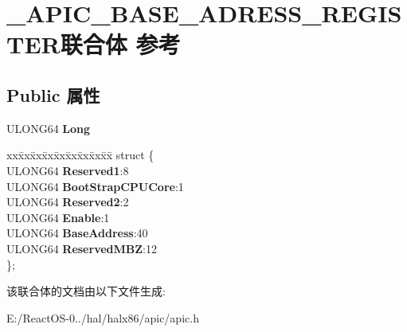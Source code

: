 \hypertarget{union___a_p_i_c___b_a_s_e___a_d_r_e_s_s___r_e_g_i_s_t_e_r}{}\section{\+\_\+\+A\+P\+I\+C\+\_\+\+B\+A\+S\+E\+\_\+\+A\+D\+R\+E\+S\+S\+\_\+\+R\+E\+G\+I\+S\+T\+E\+R联合体 参考}
\label{union___a_p_i_c___b_a_s_e___a_d_r_e_s_s___r_e_g_i_s_t_e_r}
\subsection*{Public 属性}
\begin{DoxyCompactItemize}
\item 
\mbox{\label{union___a_p_i_c___b_a_s_e___a_d_r_e_s_s___r_e_g_i_s_t_e_r_ae8ef491fd01fe4657ab5649e8cb46352}} 
U\+L\+O\+N\+G64 {\bfseries Long}
\item 
\mbox{\label{union___a_p_i_c___b_a_s_e___a_d_r_e_s_s___r_e_g_i_s_t_e_r_aa5ae1c2b770a93a03fb01f8aff7a1dd0}} 
\begin{tabbing}
xx\=xx\=xx\=xx\=xx\=xx\=xx\=xx\=xx\=\kill
struct \{\\
\>ULONG64 {\bfseries Reserved1}:8\\
\>ULONG64 {\bfseries BootStrapCPUCore}:1\\
\>ULONG64 {\bfseries Reserved2}:2\\
\>ULONG64 {\bfseries Enable}:1\\
\>ULONG64 {\bfseries BaseAddress}:40\\
\>ULONG64 {\bfseries ReservedMBZ}:12\\
\}; \\

\end{tabbing}\end{DoxyCompactItemize}


该联合体的文档由以下文件生成\+:\begin{DoxyCompactItemize}
\item 
E\+:/\+React\+O\+S-\/0../hal/halx86/apic/apic.\+h\end{DoxyCompactItemize}
